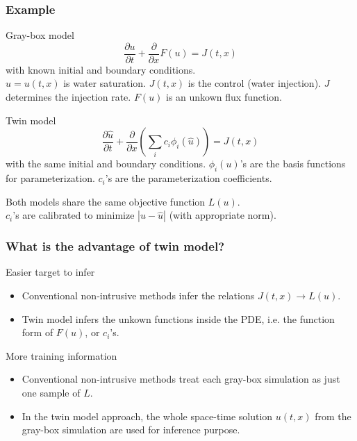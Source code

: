 \documentclass{beamer}
\begin{document}
\begin{frame}
    \frametitle{Example}\small
    \begin{exampleblock}{Gray-box model}
            $$
            \frac{\partial u}{\partial t} + \frac{\partial}{\partial x} F (u) = J(t,x)
            $$
        with known initial and boundary conditions.\\
        $u=u(t,x)$ is water
        saturation. $J(t,x)$ is the control (water injection).
        $J$ determines the injection rate.
        $F(u)$ is an unkown flux function.
        \end{exampleblock}
        \begin{exampleblock}{Twin model}
            $$
            \frac{\partial \hat{u}}{\partial t} + \frac{\partial}{\partial
            x}\left( \sum_i c_i \phi_i(\hat{u}) \right) = J(t,x)
            $$
            with the same initial and boundary conditions.
            $\phi_i(u)$'s are the basis functions for parameterization.
            $c_i$'s are the parameterization coefficients.
        \end{exampleblock}
        Both models share the same objective function $L(u)$.\\
        $c_i$'s are calibrated to minimize $|u-\hat{u}|$ (with appropriate norm). 
\end{frame}

\begin{frame}
    \frametitle{What is the advantage of twin model?}
    \begin{exampleblock}{Easier target to infer}
        \begin{itemize}
        \item Conventional non-intrusive methods infer the relations
              $J(t,x) \rightarrow L(u)$.
        \item Twin model infers the unkown functions inside the PDE, i.e. 
              the function form of $F(u)$, or $c_i$'s.
        \end{itemize}
    \end{exampleblock}

    \begin{exampleblock}{More training information}
        \begin{itemize}
            \item Conventional non-intrusive methods treat each gray-box simulation
                  as just one sample of $L$.
            \item In the twin model approach, the whole space-time solution $u(t,x)$ from the gray-box
                  simulation are used for inference purpose.
        \end{itemize}
    \end{exampleblock}
\end{frame}
\end{document}
